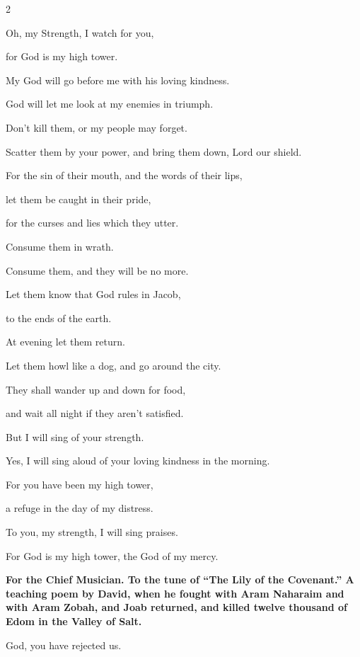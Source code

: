 \begin{multicols}{2}
	
	\myverse{}Oh, my Strength, I watch for you,
	
	for God is my high tower.
	
	
	\myverse{}My God will go before me with his loving kindness.
	
	God will let me look at my enemies in triumph.
	
	
	\myverse{}Don’t kill them, or my people may forget.
	
	Scatter them by your power, and bring them down, Lord our shield.
	
	
	\myverse{}For the sin of their mouth, and the words of their lips,
	
	let them be caught in their pride,
	
	for the curses and lies which they utter.
	
	
	\myverse{}Consume them in wrath.
	
	Consume them, and they will be no more.
	
	Let them know that God rules in Jacob,
	
	to the ends of the earth.
	
	\vspace{\baselineskip}	
	
	
	\myverse{}At evening let them return.
	
	Let them howl like a dog, and go around the city.
	
	
	\myverse{}They shall wander up and down for food,
	
	and wait all night if they aren’t satisfied.
	
	\vspace{\baselineskip}
	
	\myverse{}But I will sing of your strength.
	
	Yes, I will sing aloud of your loving kindness in the morning.
	
	For you have been my high tower,
	
	a refuge in the day of my distress.
	
	
	\myverse{}To you, my strength, I will sing praises.
	
	For God is my high tower, the God of my mercy.
	
	
	\mychapter{}\textbf{For the Chief Musician. To the tune of “The Lily of the Covenant.” A teaching poem by David,
		when he fought with Aram Naharaim and with Aram Zobah, and Joab returned, and killed twelve thousand of
		Edom in the Valley of Salt.}
	
	\myverse*{}God, you have rejected us.
	

\end{multicols}
